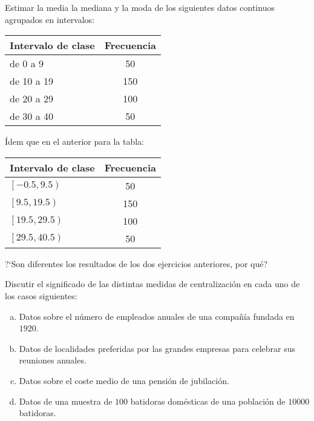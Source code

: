\documentclass[12pt]{article}
\begin{document}
\begin{prob}
Estimar la media la mediana y la moda de los siguientes datos continuos agrupados en
intervalos:

\begin{center}
\begin{tabular}{l|c}
Intervalo de clase & Frecuencia\\ \hline de 0 a 9 & 50 \\ de 10 a 19 & 150\\ de 20 a 29 &
100\\ de 30 a 40 & 50\\ \hline
\end{tabular}
\end{center}
\end{prob}

\begin{prob}
\'Idem que en el anterior para la tabla:


\begin{center}
\begin{tabular}{l|c}
Intervalo de clase & Frecuencia\\ \hline $\left[ -0.5,9.5 \right)$ & 50 \\ $\left[
9.5,19.5 \right)$ & 150\\ $\left[ 19.5,29.5 \right)$ & 100\\ $\left[ 29.5,40.5 \right)$ &
50\\ \hline
\end{tabular}
\end{center}
\end{prob}


\begin{prob}
?`Son diferentes los resultados de los dos ejercicios anteriores, por qué?
\end{prob}


\begin{prob}
Discutir el significado de las distintas medidas de centralización en cada uno de los
casos siguientes:
\begin{enumerate}[a)]
\item Datos sobre el número de empleados anuales de una
compañía fundada en $1920$.
\item Datos de localidades preferidas por las grandes empresas para
celebrar sus reuniones anuales.
\item Datos sobre el coste medio de una pensión de jubilación.
\item Datos de una muestra de $100$ batidoras domésticas de una
población de $10000$ batidoras.
\end{enumerate}
\end{prob}
\end{document}
